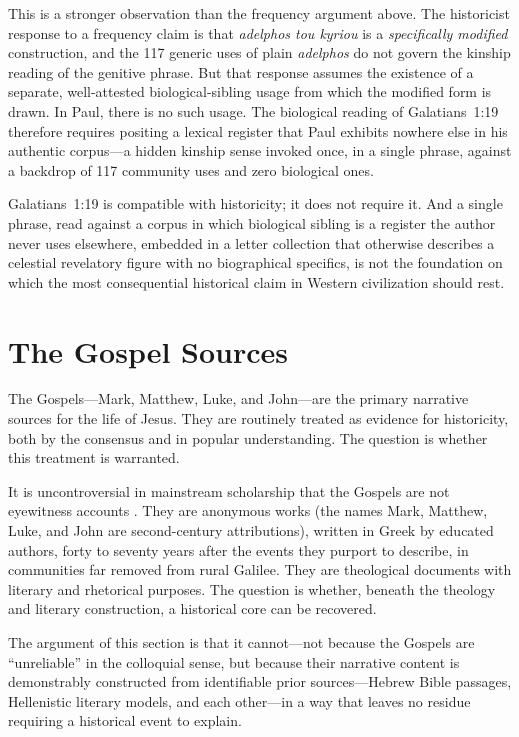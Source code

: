 \documentclass[12pt,oneside]{article}
\newcommand{\grk}[1]{\textit{#1}}   %
\begin{document}
This is a stronger observation than the frequency argument above.  The
historicist response to a frequency claim is that \grk{adelphos tou
kyriou} is a \textit{specifically modified} construction, and the 117
generic uses of plain \grk{adelphos} do not govern the kinship reading
of the genitive phrase.  But that response assumes the existence of a
separate, well-attested biological-sibling usage from which the
modified form is drawn.  In Paul, there is no such usage.  The
biological reading of Galatians~1:19 therefore requires positing a
lexical register that Paul exhibits nowhere else in his authentic
corpus---a hidden kinship sense invoked once, in a single phrase,
against a backdrop of 117 community uses and zero biological ones.

Galatians~1:19 is compatible with historicity; it does not require it.
And a single phrase, read against a corpus in which biological sibling
is a register the author never uses elsewhere, embedded in a letter
collection that otherwise describes a celestial revelatory figure with
no biographical specifics, is not the foundation on which the most
consequential historical claim in Western civilization should rest.


\section{The Gospel Sources}
\label{sec:gospels}

The Gospels---Mark, Matthew, Luke, and John---are the primary narrative
sources for the life of Jesus.  They are routinely treated as evidence
for historicity, both by the consensus and in popular understanding.
The question is whether this treatment is warranted.

It is uncontroversial in mainstream scholarship that the Gospels are not
eyewitness accounts \citep{Ehrman2009}.  They are anonymous works
(the names Mark, Matthew, Luke, and John are second-century
attributions), written in Greek by educated authors, forty to seventy
years after the events they purport to describe, in communities far
removed from rural Galilee.  They are theological documents with
literary and rhetorical purposes.  The question is whether, beneath the
theology and literary construction, a historical core can be recovered.

The argument of this section is that it cannot---not because the Gospels
are ``unreliable'' in the colloquial sense, but because their narrative
content is demonstrably constructed from identifiable prior
sources---Hebrew Bible passages, Hellenistic literary models, and each
other---in a way that leaves no residue requiring a historical event to
explain.
\end{document}
